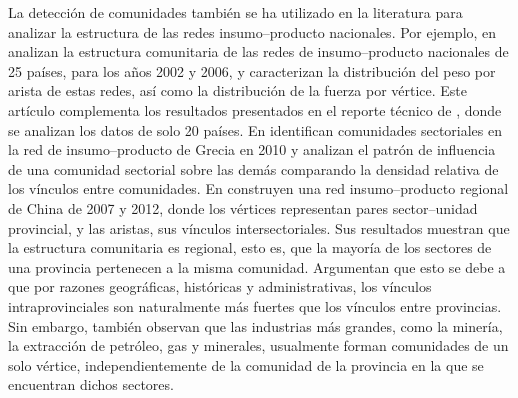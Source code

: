 La detección de comunidades también se ha utilizado en la literatura para analizar la estructura de las redes insumo--producto nacionales. Por ejemplo, en \textcite{Mcnerney2013} analizan la estructura comunitaria de las redes de insumo--producto nacionales de 25 países, para los años 2002 y 2006, y caracterizan la distribución del peso por arista de estas redes, así como la distribución de la fuerza por vértice. 
Este artículo complementa los resultados presentados en el reporte técnico de \textcite{McNerney2009}, donde se analizan los datos de solo 20 países. En \textcite{Tsekeris2017Greek} identifican comunidades sectoriales en la red de insumo--producto de Grecia en 2010 y analizan el patrón de influencia de una comunidad sectorial sobre las demás comparando la densidad relativa de los vínculos entre comunidades. En \textcite{Wang2021} construyen una red insumo--producto regional de China de 2007 y 2012, donde los vértices representan pares sector--unidad provincial, y las aristas, sus vínculos intersectoriales. Sus resultados muestran que la estructura comunitaria es regional, esto es, que la mayoría de los sectores de una provincia pertenecen a la misma comunidad. Argumentan que esto se debe a que por razones geográficas, históricas y administrativas, los vínculos intraprovinciales son naturalmente más fuertes que los vínculos entre provincias. Sin embargo, también observan que las industrias más grandes, como la minería, la extracción de petróleo, gas y minerales, usualmente forman comunidades de un solo vértice, independientemente de la comunidad de la provincia en la que se encuentran dichos sectores. 


